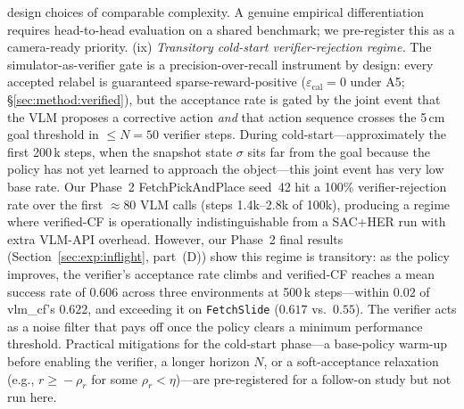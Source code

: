 \documentclass{article}
\begin{document}
design choices of comparable complexity.  A genuine empirical differentiation
requires head-to-head evaluation on a shared benchmark; we pre-register this as a
camera-ready priority.
(ix) \emph{Transitory cold-start verifier-rejection regime.} The simulator-as-verifier
gate is a precision-over-recall instrument by design: every accepted relabel is
guaranteed sparse-reward-positive ($\varepsilon_{\text{cal}}\!=\!0$
under A5; \S\ref{sec:method:verified}), but the acceptance rate is gated by the
joint event that the VLM proposes a corrective action \emph{and} that
action sequence crosses the 5\,cm goal threshold in $\le N\!=\!50$ verifier
steps. During cold-start---approximately the first 200\,k steps, when the
snapshot state $\sigma$ sits far from the goal because the policy has not yet
learned to approach the object---this joint event has very low base rate.
Our Phase~2 FetchPickAndPlace seed~42 hit a 100\% verifier-rejection rate
over the first $\approx$80 VLM calls (steps 1.4k--2.8k of 100k), producing
a regime where verified-CF is operationally indistinguishable from a SAC+HER
run with extra VLM-API overhead.
However, our Phase~2 final results (Section~\ref{sec:exp:inflight}, part~(D))
show this regime is transitory: as the policy improves, the verifier's
acceptance rate climbs and verified-CF reaches a mean success rate of
$0.606$ across three environments at 500\,k steps---within $0.02$ of
vlm\_cf's $0.622$, and exceeding it on \texttt{FetchSlide} ($0.617$
vs.\ $0.55$).
The verifier acts as a noise filter that pays off once the policy clears a
minimum performance threshold.
Practical mitigations for the cold-start phase---a base-policy warm-up
before enabling the verifier, a longer horizon $N$, or a soft-acceptance
relaxation (e.g., $r\!\ge\!-\rho_r$ for some $\rho_r\!<\!\eta$)---are
pre-registered for a follow-on study but not run here.
\end{document}
